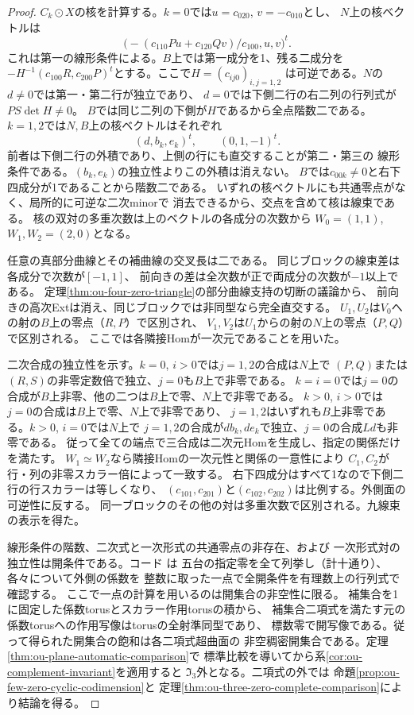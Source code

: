 \begin{proof}
$C_k\odot X$の核を計算する。$k=0$では$u=c_{020}$, $v=-c_{010}$とし、
$N$上の核ベクトルは
\[
 \big(-(c_{110}Pu+c_{120}Qv)/c_{100},u,v\big)^t .
\]
これは第一の線形条件による。$B$上では第一成分を1、残る二成分を
$-H^{-1}(c_{100}R,c_{200}P)^t$とする。ここで$H=(c_{ij0})_{i,j=1,2}$
は可逆である。$N$の$d\ne0$では第一・第二行が独立であり、
$d=0$では下側二行の右二列の行列式が$PS\det H\ne0$。
$B$では同じ二列の下側が$H$であるから全点階数二である。
$k=1,2$では$N,B$上の核ベクトルはそれぞれ
\[
 (d,b_k,e_k)^t,\qquad (0,1,-1)^t .
\]
前者は下側二行の外積であり、上側の行にも直交することが第二・第三の
線形条件である。$(b_k,e_k)$の独立性よりこの外積は消えない。
$B$では$c_{00k}\ne0$と右下四成分が1であることから階数二である。
いずれの核ベクトルにも共通零点がなく、局所的に可逆な二次minorで
消去できるから、交点を含めて核は線束である。
核の双対の多重次数は上のベクトルの各成分の次数から
$W_0=(1,1)$, $W_1,W_2=(2,0)$となる。

任意の真部分曲線とその補曲線の交叉長は二である。
同じブロックの線束差は各成分で次数が$[-1,1]$、
前向きの差は全次数が正で両成分の次数が$-1$以上である。
定理\ref{thm:ou-four-zero-triangle}の部分曲線支持の切断の議論から、
前向きの高次Extは消え、同じブロックでは非同型なら完全直交する。
$U_1,U_2$は$V_0$への射の$B$上の零点（$R,P$）で区別され、
$V_1,V_2$は$U_1$からの射の$N$上の零点（$P,Q$）で区別される。
ここでは各隣接Homが一次元であることを用いた。

二次合成の独立性を示す。$k=0$, $i>0$では$j=1,2$の合成は$N$上で
$(P,Q)$または$(R,S)$の非零定数倍で独立、$j=0$も$B$上で非零である。
$k=i=0$では$j=0$の合成が$B$上非零、他の二つは$B$上で零、$N$上で非零である。
$k>0$, $i>0$では$j=0$の合成は$B$上で零、$N$上で非零であり、
$j=1,2$はいずれも$B$上非零である。$k>0$, $i=0$では$N$上で
$j=1,2$の合成が$d b_k,d e_k$で独立、$j=0$の合成$Ld$も非零である。
従って全ての端点で三合成は二次元Homを生成し、指定の関係だけを満たす。
$W_1\simeq W_2$なら隣接Homの一次元性と関係の一意性により
$C_1,C_2$が行・列の非零スカラー倍によって一致する。
右下四成分はすべて1なので下側二行の行スカラーは等しくなり、
$(c_{101},c_{201})$と$(c_{102},c_{202})$は比例する。外側面の可逆性に反する。
同一ブロックのその他の対は多重次数で区別される。九線束の表示を得た。

線形条件の階数、二次式と一次形式の共通零点の非存在、および
一次形式対の独立性は開条件である。コード
は
五台の指定零を全て列挙し（計十通り）、各々について外側の係数を
整数に取った一点で全開条件を有理数上の行列式で確認する。
ここで一点の計算を用いるのは開集合の非空性に限る。
補集合を1に固定した係数torusとスカラー作用torusの積から、
補集合二項式を満たす元の係数torusへの作用写像はtorusの全射準同型であり、
標数零で開写像である。従って得られた開集合の飽和は各二項式超曲面の
非空稠密開集合である。定理\ref{thm:ou-plane-automatic-comparison}で
標準比較を導いてから系\ref{cor:ou-complement-invariant}を適用すると
$\mathfrak I_3$外となる。二項式の外では
命題\ref{prop:ou-few-zero-cyclic-codimension}と
定理\ref{thm:ou-three-zero-complete-comparison}により結論を得る。
\end{proof}

